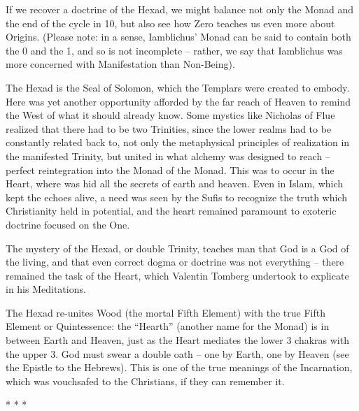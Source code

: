 If we recover a doctrine of the Hexad, we might balance not only the Monad and the end of the cycle in 10, but also see how Zero teaches us even more about Origins. (Please note: in a sense, Iamblichus' Monad can be said to contain both the 0 and the 1, and so is not incomplete -- rather, we say that Iamblichus was more concerned with Manifestation than Non-Being).

The Hexad is the Seal of Solomon, which the Templars were created to embody. Here was yet another opportunity afforded by the far reach of Heaven to remind the West of what it should already know. Some mystics like Nicholas of Flue realized that there had to be two Trinities, since the lower realms had to be constantly related back to, not only the metaphysical principles of realization in the manifested Trinity, but united in what alchemy was designed to reach -- perfect reintegration into the Monad of the Monad. This was to occur in the Heart, where was hid all the secrets of earth and heaven. Even in Islam, which kept the echoes alive, a need was seen by the Sufis to recognize the truth which Christianity held in potential, and the heart remained paramount to exoteric doctrine focused on the One.

The mystery of the Hexad, or double Trinity, teaches man that God is a God of the living, and that even correct dogma or doctrine was not everything -- there remained the task of the Heart, which Valentin Tomberg undertook to explicate in his Meditations.

The Hexad re-unites Wood (the mortal Fifth Element) with the true Fifth Element or Quintessence: the ``Hearth'' (another name for the Monad) is in between Earth and Heaven, just as the Heart mediates the lower 3 chakras with the upper 3. God must swear a double oath -- one by Earth, one by Heaven (see the Epistle to the Hebrews). This is one of the true meanings of the Incarnation, which was vouchsafed to the Christians, if they can remember it.



\begin{center}* * *\end{center}

